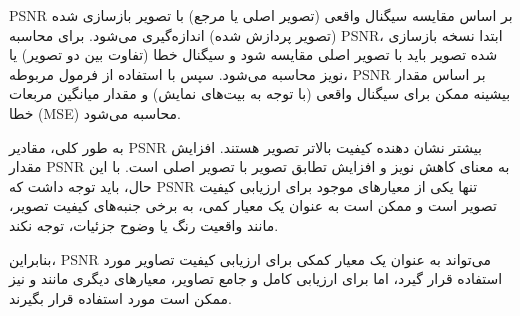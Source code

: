 PSNR بر اساس مقایسه سیگنال واقعی (تصویر اصلی یا مرجع) با تصویر بازسازی شده (تصویر پردازش شده) اندازه‌گیری می‌شود. برای محاسبه PSNR، ابتدا نسخه بازسازی شده تصویر باید با تصویر اصلی مقایسه شود و سیگنال خطا (تفاوت بین دو تصویر) یا نویز محاسبه می‌شود. سپس با استفاده از فرمول مربوطه، PSNR بر اساس مقدار بیشینه ممکن برای سیگنال واقعی (با توجه به بیت‌های نمایش) و مقدار میانگین مربعات خطا (MSE) محاسبه می‌شود.

به طور کلی، مقادیر PSNR بیشتر نشان دهنده کیفیت بالاتر تصویر هستند. افزایش مقدار PSNR به معنای کاهش نویز و افزایش تطابق تصویر با تصویر اصلی است. با این حال، باید توجه داشت که PSNR تنها یکی از معیارهای موجود برای ارزیابی کیفیت تصویر است و ممکن است به عنوان یک معیار کمی، به برخی جنبه‌های کیفیت تصویر، مانند واقعیت رنگ یا وضوح جزئیات، توجه نکند.

بنابراین، PSNR می‌تواند به عنوان یک معیار کمکی برای ارزیابی کیفیت تصاویر مورد استفاده قرار گیرد، اما برای ارزیابی کامل و جامع تصاویر، معیارهای دیگری مانند 
و
نیز ممکن است مورد استفاده قرار بگیرند.